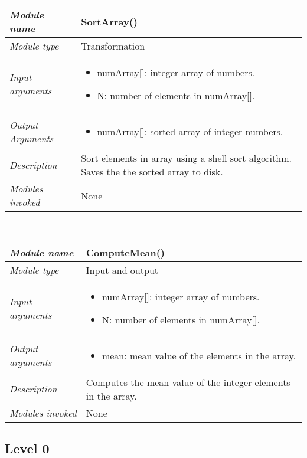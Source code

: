 {\begin{minipage}{15cm}
\begin{tabular}{|l|m{10cm}|}
\emph{Module name} & SortArray() \\ \hline
\emph{Module type} & Transformation \\
\emph{Input arguments} & 
\begin{itemize}
\item   numArray{[}{]}: integer array of numbers.
\item   N: number of elements in numArray{[}{]}.
\end{itemize}  \\ \hline
\emph{Output Arguments} & 
\begin{itemize}
\item  numArray{[}{]}: sorted array of integer numbers.
\end{itemize} \\ \hline
\emph{Description} & Sort elements in array using a shell sort
algorithm. Saves the the sorted array to disk. \\
\emph{Modules invoked} & None \\
\end{tabular}
\\
\begin{tabular}{|l|m{10cm}|}
\hline
\emph{Module name} & ComputeMean()\\ \hline
\emph{Module type} & Input and output \\
\emph{Input arguments} & 
\begin{itemize}
\item  numArray{[}{]}: integer array of numbers.
\item  N: number of elements in numArray{[}{]}.
\end{itemize} \\ \hline
\emph{Output arguments} & 
\begin{itemize}
\item  mean: mean value of the elements in the array.
\end{itemize} \\ \hline
\emph{Description} & Computes the mean value of the integer elements in
the array. \\
\emph{Modules invoked} & None \\
\end{tabular}

\end{minipage} }



\subsection*{Level 0}
\label{subsection:level-0-2}


